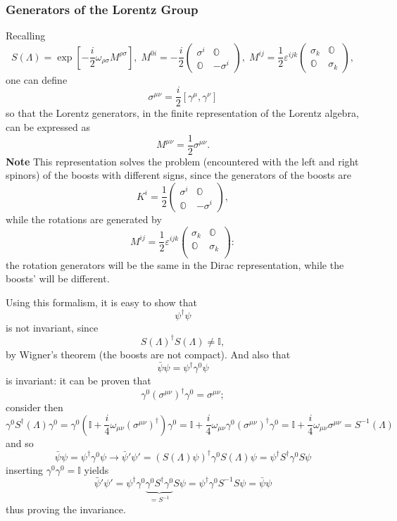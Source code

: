 \subsubsection{Generators of the Lorentz Group}
Recalling
$$S(\Lambda) = \exp\left[-\frac{i}{2}\omega_{\rho\sigma}M^{\rho\sigma}\right],\;
M^{0i}=-\frac{i}{2}\begin{pmatrix}
    \sigma^i&\mathbb{O}\\
    \mathbb{O}&-\sigma^i
\end{pmatrix},\;
M^{ij}=\frac{1}{2}\varepsilon^{ijk}\begin{pmatrix}
    \sigma_k&\mathbb{O}\\
    \mathbb{O}&\sigma_k
\end{pmatrix},
$$
one can define
$$\sigma^{\mu\nu}=\frac{i}{2}\left[\gamma^\mu,\gamma^\nu\right]$$
so that the Lorentz generators, in the finite representation of the Lorentz 
algebra, can be expressed as
$$M^{\mu\nu}=\frac{1}{2}\sigma^{\mu\nu}.$$
\textbf{Note} This representation solves the problem (encountered with the left 
and right spinors) of the boosts with different signs, since the generators of the
boosts are
$$K^i = \frac{1}{2}\begin{pmatrix}
    \sigma^i&\mathbb{O}\\
    \mathbb{O}&-\sigma^i
\end{pmatrix},
$$
while the rotations are generated by
$$M^{ij} = \frac12 \varepsilon^{ijk}\begin{pmatrix}
    \sigma_k&\mathbb{O}\\
    \mathbb{O}&\sigma_k\\
\end{pmatrix}:
$$
the rotation generators will be the same in the Dirac representation, while the
boosts' will be different.

Using this formalism, it is easy to show that
$$\psi^\dagger\psi$$
is not invariant, since
$$S(\Lambda)^\dagger S(\Lambda)\neq\mathbb{I},$$
by Wigner's theorem (the boosts are not compact). And also that
$$\bar\psi\psi = \psi^\dagger\gamma^0\psi$$
is invariant: it can be proven that
$$\gamma^0(\sigma^{\mu\nu})^\dagger\gamma^0 = \sigma^{\mu\nu};$$
consider then
$$\gamma^0S^\dagger(\Lambda)\gamma^0 = \gamma^0\left(\mathbb{I}+\frac{i}{4}
    \omega_{\mu\nu}(\sigma^{\mu\nu})^\dagger\right)\gamma^0 = \mathbb{I} +
    \frac{i}{4}\omega_{\mu\nu}\gamma^0(\sigma^{\mu\nu})^\dagger\gamma^0 = 
    \mathbb{I} + \frac{i}{4}\omega_{\mu\nu}\sigma^{\mu\nu}=S^{-1}(\Lambda)$$
and so
$$\bar\psi\psi=\psi^\dagger\gamma^0\psi\longrightarrow\bar\psi'\psi'=
\left(S(\Lambda)\psi\right)^\dagger\gamma^0S(\Lambda)\psi=
\psi^\dagger S^\dagger\gamma^0S\psi$$
inserting $\gamma^0\gamma^0=\mathbb{I}$ yields
$$\bar\psi'\psi' = \psi^\dagger\gamma^0\underbrace{\gamma^0S^\dagger\gamma^0}_
{=S^{-1}}S\psi=\psi^\dagger\gamma^0S^{-1}S\psi = \bar\psi\psi$$
thus proving the invariance.

